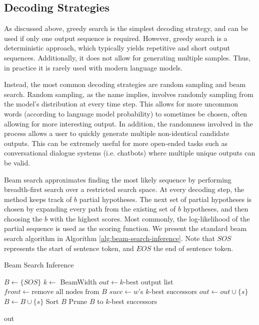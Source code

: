 \documentclass[thesis.tex]{subfiles}
\begin{document}
\subsection{Decoding Strategies} \label{sec:decoding_strategies}

As discussed above, greedy search is the simplest decoding strategy, and can be used if only one output sequence is required. However, greedy search is a deterministic approach, which typically yields repetitive and short output sequences. Additionally, it does not allow for generating multiple samples. Thus, in practice it is rarely used with modern language models. 

Instead, the most common decoding strategies are random sampling and beam search. Random sampling, as the name implies, involves randomly sampling from the model's distribution at every time step. This allows for more uncommon words (according to language model probability) to sometimes be chosen, often allowing for more interesting output. In addition, the randomness involved in the process allows a user to quickly generate multiple non-identical candidate outputs. This can be extremely useful for more open-ended tasks such as conversational dialogue systems (i.e. chatbots) where multiple unique outputs can be valid.

Beam search approximates finding the most likely sequence by performing breadth-first search over a restricted search space. At every decoding step, the method keeps track of $b$ partial hypotheses. The next set of partial hypotheses is chosen by expanding every path from the existing set of $b$ hypotheses, and then choosing the $b$ with the highest scores. Most commonly, the log-likelihood of the partial sequence is used as the scoring function. We present the standard beam search algorithm in Algorithm \ref{alg:beam-search-inference}. Note that $SOS$ represents the start of sentence token, and $EOS$ the end of sentence token.

\begin{algorithm}
\caption{Beam Search Inference}
\label{alg:beam-search-inference}
\begin{algorithmic}[1]
\State $B \gets \{SOS\}$
\State $k \gets $ BeamWidth
\State $out \gets k$-best output list
    \State $front \gets \text{remove all nodes from } B$
    \State $succ \gets w$'s $k$-best successors
        \State $out \gets out \cup \{s\}$
    \Else
        \State $B \gets B \cup \{s\}$
    \EndIf
    \EndFor
    \EndFor
    \State Sort $B$
        \State Prune $B$ to $k$-best successors
    \EndIf
\EndWhile

\Return out
\EndProcedure
\end{algorithmic}
\end{algorithm}
\end{document}
